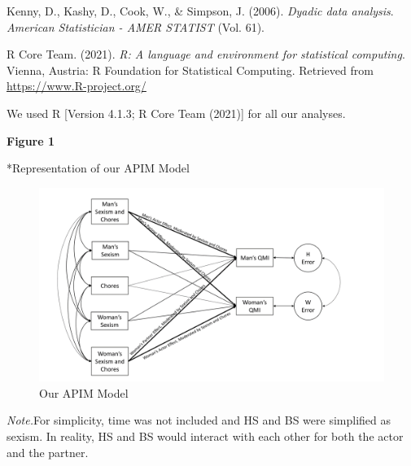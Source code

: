 \documentclass[
  man]{apa6}
\newlength{\cslhangindent}
\newlength{\cslentryspacingunit} %
\newenvironment{CSLReferences}[2] %
 {%
  \setlength{\parindent}{0pt}
  \ifodd #1
  \let\oldpar\par
  \def\par{\hangindent=\cslhangindent\oldpar}
  \fi
  \setlength{\parskip}{#2\cslentryspacingunit}
 }%
 {}
\begin{document}
\begingroup
\setlength{\parindent}{-0.5in}
\setlength{\leftskip}{0.5in}

\hypertarget{refs}{}
\begin{CSLReferences}{1}{0}
\leavevmode{}%
Kenny, D., Kashy, D., Cook, W., \& Simpson, J. (2006). \emph{Dyadic data analysis}. \emph{American Statistician - AMER STATIST} (Vol. 61).

\leavevmode{}%
R Core Team. (2021). \emph{R: A language and environment for statistical computing}. Vienna, Austria: R Foundation for Statistical Computing. Retrieved from \url{https://www.R-project.org/}

\end{CSLReferences}

\endgroup

We used R {[}Version 4.1.3; R Core Team (2021){]} for all our analyses.

\newpage

\textbf{Figure 1}

*Representation of our APIM Model

\begin{figure}
\centering
\includegraphics{APIM.png}
\caption{Our APIM Model}
\end{figure}

\emph{Note.}For simplicity, time was not included and HS and BS were simplified as sexism. In reality, HS and BS would interact with each other for both the actor and the partner.
\end{document}

